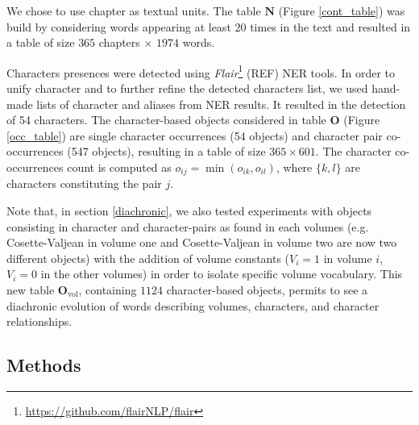\documentclass[
twocolumn,
]{ceurart}
\begin{document}
We chose to use chapter as textual units. The table $\mathbf{N}$ (Figure \ref{cont_table}) was build by considering words appearing at least $20$ times in the text and resulted in a table of size $365$ chapters $\times$ $1974$ words.

Characters presences were detected using \emph{Flair}\footnote{\url{https://github.com/flairNLP/flair}} (REF) NER tools. In order to unify character and to further refine the detected characters list, we used hand-made lists of character and aliases from NER results. It resulted in the detection of 54 characters. The character-based objects considered in table $\mathbf{O}$ (Figure \ref{occ_table}) are single character occurrences (54 objects) and character pair co-occurrences (547 objects), resulting in a table of size $365 \times 601$. The character co-occurrences count is computed as $o_{ij} = \min(o_{ik}, o_{il})$, where $\{k, l\}$ are characters constituting the pair $j$. 

Note that, in section \ref{diachronic}, we also tested experiments with objects consisting in character and character-pairs as found in each volumes (e.g. Cosette-Valjean in volume one and Cosette-Valjean in volume two are now two different objects) with the addition of volume constants ($V_i=1$ in volume $i$, $V_i=0$ in the other volumes) in order to isolate specific volume vocabulary. This new table $\mathbf{O}_\text{vol}$, containing $1124$ character-based objects, permits to see a diachronic evolution of words describing volumes, characters, and character relationships. 

\subsection{Methods}
\end{document}
